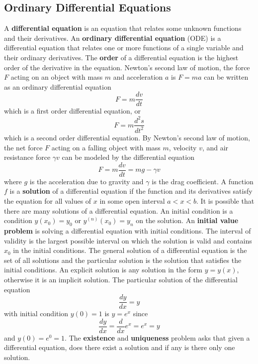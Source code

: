 \subsection{Ordinary Differential Equations}
A \textbf{differential equation} is an equation that relates some unknown
functions and their derivatives.
An \textbf{ordinary differential equation} (ODE) is a differential equation
that relates one or more functions of a single variable and their ordinary
derivatives.
The \textbf{order} of a differential equation is the highest order of the
derivative in the equation.
Newton's second law of motion, the force \(F\) acting on an object with mass
\(m\) and acceleration \(a\) is \(F=ma\) can be written as an ordinary
differential equation
\[F=m\frac{dv}{dt}\]
which is a first order differential equation, or
\[F=m\frac{d^2s}{dt^2}\]
 which is a second order differential equation.
By Newton's second law of motion, the net force \(F\) acting on a falling
object with mass \(m\), velocity \(v\), and air resistance force \(\gamma v\)
can be modeled by the differential equation
\[F=m\frac{dv}{dt}=mg-\gamma v\]
where \(g\) is the acceleration due to gravity and \(\gamma\) is the drag
coefficient.
A function \(f\) is a \textbf{solution} of a differential equation if the
function and its derivatives satisfy the equation for all values of \(x\) in
some open interval \(a<x<b\).
It is possible that there are many solutions of a differential equation.
An initial condition is a condition \(y(x_0)=y_0\) or
\(y^{(n)}(x_0)=y_n\) on the solution.
An \textbf{initial value problem} is solving a differential equation with initial conditions.
The interval of validity is the largest possible interval on which
the solution is valid and contains \(x_0\) in the initial conditions.
The general solution of a differential equation is the set of all solutions
and the particular solution is the solution that satisfies the initial
conditions.
An explicit solution is any solution in the form \(y=y(x)\), otherwise it is
an implicit solution.
The particular solution of the differential equation
\[\frac{dy}{dx}=y\]
with initial
condition \(y(0)=1\) is \(y=e^x\) since
\[\frac{dy}{dx}=\frac{d}{dx}e^x=e^x=y\]
and \(y(0)=e^0=1\).
The \textbf{existence} and \textbf{uniqueness} problem asks that given a
differential equation, does there exist a solution and if any is there only
one solution.